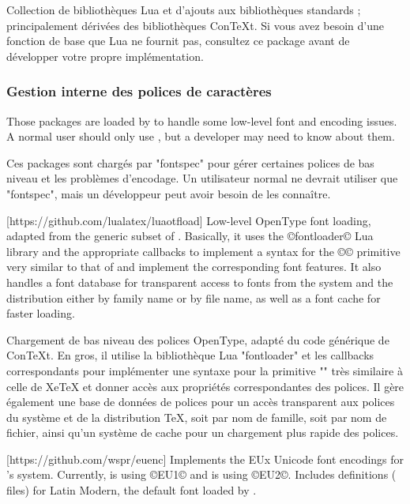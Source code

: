 \documentclass{lltxdoc}
\begin{document}
Collection de bibliothèques Lua et d'ajouts aux bibliothèques standards ; principalement dérivées des bibliothèques ConTeXt. Si vous avez besoin d'une fonction de base que Lua ne fournit pas, consultez ce package avant de développer votre propre implémentation.

\subsubsection{Gestion interne des polices de caractères}\label{fontint}

Those packages are loaded by  to handle some low-level font and
encoding issues. A normal user should only use , but a developer
may need to know about them.


Ces packages sont chargés par "fontspec" pour gérer certaines polices de bas niveau et les problèmes d'encodage. Un utilisateur normal ne devrait utiliser que "fontspec", mais un développeur peut avoir besoin de les connaître.

[https://github.com/lualatex/luaotfload]
Low-level OpenType font loading, adapted from the generic subset of \context.
Basically, it uses the ©fontloader© Lua library and the appropriate callbacks
to implement a syntax for the ©\font© primitive very similar to that of \xetex
and implement the corresponding font features. It also handles a font database
for transparent access to fonts from the system and the \tex distribution
either by family name or by file name, as well as a font cache for faster
loading.

Chargement de bas niveau des polices OpenType, adapté du code générique de ConTeXt. En gros, il utilise la bibliothèque Lua "fontloader" et les callbacks correspondants pour implémenter une syntaxe pour la primitive "\font" très similaire à celle de XeTeX et donner accès aux propriétés correspondantes des polices. Il gère également une base de données de polices pour un accès transparent aux polices du système et de la distribution TeX, soit par nom de famille, soit par nom de fichier, ainsi qu'un système de cache pour un chargement plus rapide des polices.

[https://github.com/wspr/euenc]
Implements the EUx Unicode font encodings for \latex's  system.
Currently, \xelatex is using ©EU1© and \lualatex is using ©EU2©. Includes
definitions ( files) for Latin Modern, the default font loaded by
.
\end{document}

